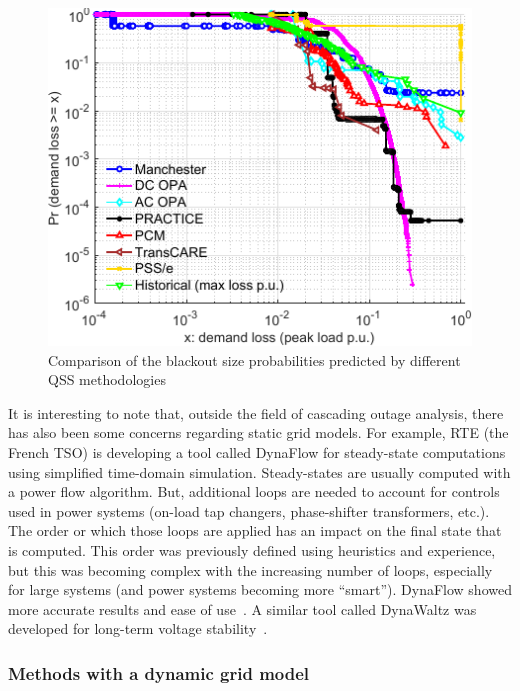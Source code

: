 \begin{figure}
    \centering
    \includegraphics[width=0.6\linewidth]{Figs/QSS_ccdf.pdf}
    \caption{Comparison of the blackout size probabilities predicted by different QSS methodologies~\cite{Benchmarking2018}}
    \label{fig:QSS_ccdf}
\end{figure}

It is interesting to note that, outside the field of cascading outage analysis, there has also been some concerns regarding static grid models. For example, RTE (the French TSO) is developing a tool called DynaFlow for steady-state computations using simplified time-domain simulation. Steady-states are usually computed with a power flow algorithm. But, additional loops are needed to account for controls used in power systems (\eg on-load tap changers, phase-shifter transformers, etc.). The order or which those loops are applied has an impact on the final state that is computed. This order was previously defined using heuristics and experience, but this was becoming complex with the increasing number of loops, especially for large systems (and power systems becoming more ``smart''). DynaFlow showed more accurate results and ease of use~\cite{DynaFlow}. A similar tool called DynaWaltz was developed for long-term voltage stability~\cite{DynaWaltz}. %



\subsubsection{Methods with a dynamic grid model}
\label{sec:DynMethods}

